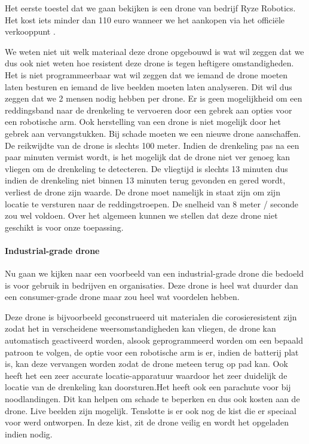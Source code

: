 \subitem
Het eerste toestel dat we gaan bekijken is een drone van bedrijf Ryze Robotics. \autocite{CheapDrone} Het kost iets minder dan 110 euro wanneer we het aankopen via het officiële verkooppunt \autocite{CheapDroneOfficial}. 

We weten niet uit welk materiaal deze drone opgebouwd is wat wil zeggen dat we dus ook niet weten hoe resistent deze drone is tegen heftigere omstandigheden. Het is niet programmeerbaar wat wil zeggen dat we iemand de drone moeten laten besturen en iemand de live beelden moeten laten analyseren. Dit wil dus zeggen dat we 2 mensen nodig hebben per drone. Er is geen mogelijkheid om een reddingsband naar de drenkeling te vervoeren door een gebrek aan opties voor een robotische arm. Ook herstelling van een drone is niet mogelijk door het gebrek aan vervangstukken. Bij schade moeten we een nieuwe drone aanschaffen. De reikwijdte van de drone is slechts 100 meter. Indien de drenkeling pas na een paar minuten vermist wordt, is het mogelijk dat de drone niet ver genoeg kan vliegen om de drenkeling te detecteren. De vliegtijd is slechts 13 minuten dus indien de drenkeling niet binnen 13 minuten terug gevonden en gered wordt, verliest de drone zijn waarde.
De drone moet namelijk in staat zijn om zijn locatie te versturen naar de reddingstroepen. De snelheid van 8 meter / seconde zou wel voldoen.
Over het algemeen kunnen we stellen dat deze drone niet geschikt is voor onze toepassing.

\paragraph{Industrial-grade drone}

\subitem
Nu gaan we kijken naar een voorbeeld van een industrial-grade drone die bedoeld is voor gebruik in bedrijven en organisaties. Deze drone is heel wat duurder dan een consumer-grade drone maar zou heel wat voordelen hebben.

Deze drone is bijvoorbeeld geconstrueerd uit materialen die corosieresistent zijn zodat het in verscheidene weersomstandigheden kan vliegen, de drone kan automatisch geactiveerd worden, alsook geprogrammeerd worden om een bepaald patroon te volgen, de optie voor een robotische arm is er, indien de batterij plat is, kan deze vervangen worden zodat de drone meteen terug op pad kan. Ook heeft het een zeer accurate locatie-apparatuur waardoor het zeer duidelijk de locatie van de drenkeling kan doorsturen.Het heeft ook een parachute voor bij noodlandingen. Dit kan helpen om schade te beperken en dus ook kosten aan de drone. Live beelden zijn mogelijk. Tenslotte is er ook nog de kist die er speciaal voor werd ontworpen. In deze kist, zit de drone veilig en wordt het opgeladen indien nodig. 

